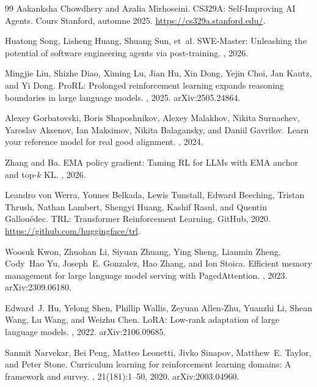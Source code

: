 \documentclass[11pt,a4paper]{article}
\begin{document}
\begin{thebibliography}{99}
Aakanksha Chowdhery and Azalia Mirhoseini.
\newblock CS329A: Self-Improving AI Agents. Cours Stanford, automne 2025.
\newblock \url{https://cs329a.stanford.edu/}.

Huatong Song, Lisheng Huang, Shuang Sun, et~al.
\newblock SWE-Master: Unleashing the potential of software engineering agents via post-training.
, 2026.

Mingjie Liu, Shizhe Diao, Ximing Lu, Jian Hu, Xin Dong, Yejin Choi, Jan Kautz, and Yi Dong.
\newblock ProRL: Prolonged reinforcement learning expands reasoning boundaries in large language models.
, 2025. arXiv:2505.24864.

Alexey Gorbatovski, Boris Shaposhnikov, Alexey Malakhov, Nikita Surnachev, Yaroslav Aksenov, Ian Maksimov, Nikita Balagansky, and Daniil Gavrilov.
\newblock Learn your reference model for real good alignment.
, 2024.

Zhang and Ba.
\newblock EMA policy gradient: Taming RL for LLMs with EMA anchor and top-$k$ KL.
, 2026. %

Leandro von Werra, Younes Belkada, Lewis Tunstall, Edward Beeching, Tristan Thrush, Nathan Lambert, Shengyi Huang, Kashif Rasul, and Quentin Gallou\'edec.
\newblock TRL: Transformer Reinforcement Learning.
\newblock GitHub, 2020. \url{https://github.com/huggingface/trl}.

Woosuk Kwon, Zhuohan Li, Siyuan Zhuang, Ying Sheng, Lianmin Zheng, Cody~Hao Yu, Joseph~E. Gonzalez, Hao Zhang, and Ion Stoica.
\newblock Efficient memory management for large language model serving with PagedAttention.
, 2023. arXiv:2309.06180.

Edward~J. Hu, Yelong Shen, Phillip Wallis, Zeyuan Allen-Zhu, Yuanzhi Li, Shean Wang, Lu Wang, and Weizhu Chen.
\newblock LoRA: Low-rank adaptation of large language models.
, 2022. arXiv:2106.09685.

Sanmit Narvekar, Bei Peng, Matteo Leonetti, Jivko Sinapov, Matthew~E. Taylor, and Peter Stone.
\newblock Curriculum learning for reinforcement learning domains: A framework and survey.
, 21(181):1--50, 2020. arXiv:2003.04960.


\end{thebibliography}
\end{document}
